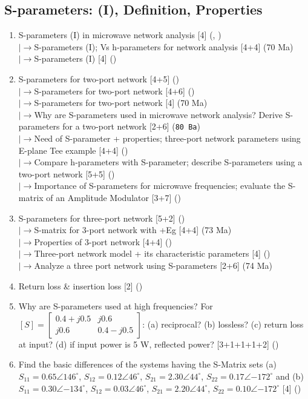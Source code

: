 \documentclass[12pt]{article}
\newcommand{\lb}{\\$\left|\rightarrow\right.$}
\begin{document}
  \subsection{S-parameters: (I), Definition, Properties}
    \begin{enumerate}[topsep=0pt, noitemsep]
      \item S-parameters (I) in microwave network analysis \hfill [4] (, )
        \lb S-parameters (I); Vs h-parameters for network analysis \hfill [4+4] (70 Ma)
        \lb S-parameters (I) \hfill [4] ()
      \item S-parameters for two-port network \hfill [4+5] ()
        \lb S-parameters for two-port network \hfill [4+6] ()
        \lb S-parameters for two-port network \hfill [4] (70 Ma)
        \lb Why are S-parameters used in microwave network analysis? Derive S-parameters for a two-port network \hfill [2+6] (\texttt{80 Ba})
        \lb Need of S-parameter + properties; three-port network parameters using E-plane Tee example \hfill [4+4] ()
        \lb Compare h-parameters with S-parameter; describe S-parameters using a two-port network \hfill [5+5] ()
        \lb Importance of S-parameters for microwave frequencies; evaluate the S-matrix of an Amplitude Modulator \hfill [3+7] ()
      \item S-parameters for three-port network \hfill [5+2] ()
        \lb S-matrix for 3-port network with +Eg \hfill [4+4] (73 Ma)
        \lb Properties of 3-port network \hfill [4+4] ()
        \lb Three-port network model + its characteristic parameters \hfill [4] ()
        \lb Analyze a three port network using S-parameters \hfill [2+6] (74 Ma)
      \item Return loss \& insertion loss \hfill [2] ()
      \item Why are S-parameters used at high frequencies? For $[S]=\begin{bmatrix}0.4{+}j0.5 & j0.6\\ j0.6 & 0.4{-}j0.5\end{bmatrix}$: (a) reciprocal? (b) lossless? (c) return loss at input? (d) if input power is 5 W, reflected power? \hfill [3+1+1+1+2] ()
      \item Find the basic differences of the systems having the S-Matrix sets (a) $S_{11}{=}0.65\angle146^\circ$, $S_{12}{=}0.12\angle46^\circ$, $S_{21}{=}2.30\angle44^\circ$, $S_{22}{=}0.17\angle{-172^\circ}$ and (b) $S_{11}{=}0.30\angle{-134^\circ}$, $S_{12}{=}0.03\angle46^\circ$, $S_{21}{=}2.20\angle44^\circ$, $S_{22}{=}0.10\angle{-172^\circ}$ \hfill [4] ()
    \end{enumerate}
\end{document}
